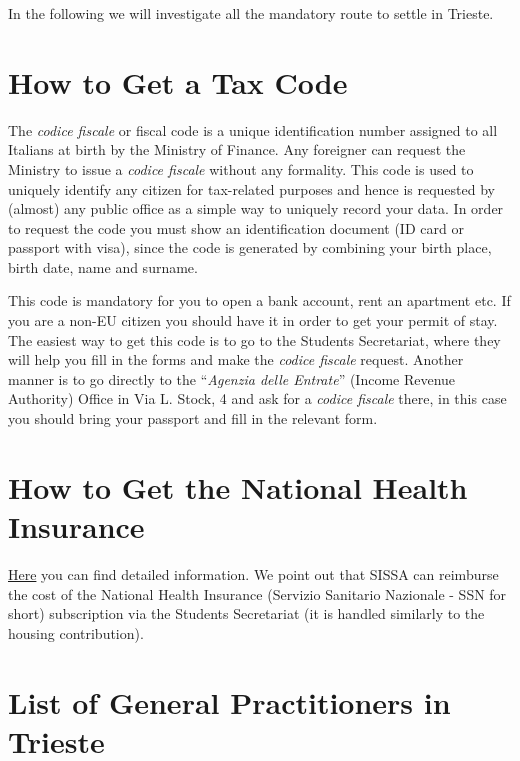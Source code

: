 \documentclass{sissavademecum}
\begin{document}
In the following we will investigate all the mandatory route to settle in Trieste.


\section{How to Get a Tax Code}

The \textit{codice fiscale} or fiscal code is a unique identification number assigned to all Italians at birth by the Ministry of Finance. Any foreigner can request the Ministry to issue a \textit{codice fiscale} without any formality. This code is used to uniquely identify any citizen for tax-related purposes and hence is requested by (almost) any public office as a simple way to uniquely record your data. In order to request the code you must show an identification document (ID card or passport with visa), since the code is generated by combining your birth place, birth date, name and surname.

This code is mandatory for you to open a bank account, rent an apartment etc. If you are a non-EU citizen you should have it in order to get your permit of stay. The easiest way to get this code is to go to the Students Secretariat, where they will help you fill in the forms and make the \textit{codice fiscale} request. Another manner is to go directly to the ``\textit{Agenzia delle Entrate}'' (Income Revenue Authority) Office in Via L. Stock, 4 and ask for a \textit{codice fiscale} there, in this case you should bring your passport and fill in the relevant form. 


\section{How to Get the National Health Insurance}

\href{http://wiki.sissa.it/students/index.php/Health_Insurance}{Here} you can find detailed information. We point out that SISSA can reimburse the cost of the National Health Insurance (Servizio Sanitario Nazionale - SSN for short) subscription via the Students Secretariat (it is handled similarly to the housing contribution).


\section{List of General Practitioners in Trieste}
\end{document}
